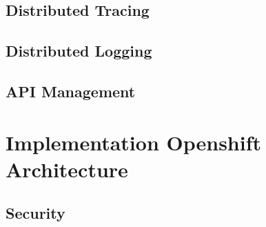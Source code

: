 \subsection{Distributed Tracing}
\label{sec:esbi-impl-tracing}

\subsection{Distributed Logging}
\label{sec:esbi-impl-logging}

\subsection{API Management}
\label{sec:esboc-impl-api}

\section{Implementation Openshift Architecture}
\label{sec:esbi-impl-oc}

\subsection{Security}
\label{sec:esboc-impl-security}
